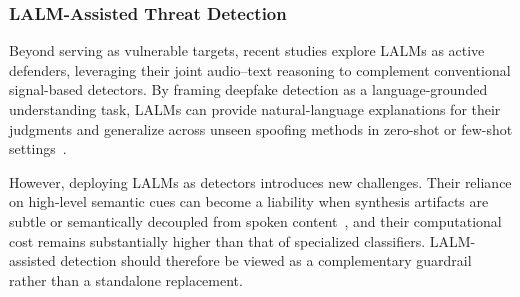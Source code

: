 \documentclass{llmxive}
\begin{document}


\subsubsection{LALM-Assisted Threat Detection}

Beyond serving as vulnerable targets, recent studies explore LALMs as active defenders, leveraging their joint audio--text reasoning to complement conventional signal-based detectors. By framing deepfake detection as a language-grounded understanding task, LALMs can provide natural-language explanations for their judgments and generalize across unseen spoofing methods in zero-shot or few-shot settings~\cite{li2025dfallm,xie2026interpretable}.

However, deploying LALMs as detectors introduces new challenges. Their reliance on high-level semantic cues can become a liability when synthesis artifacts are subtle or semantically decoupled from spoken content~\cite{nguyen2026analyzing}, and their computational cost remains substantially higher than that of specialized classifiers. LALM-assisted detection should therefore be viewed as a complementary guardrail rather than a standalone replacement.
\end{document}

